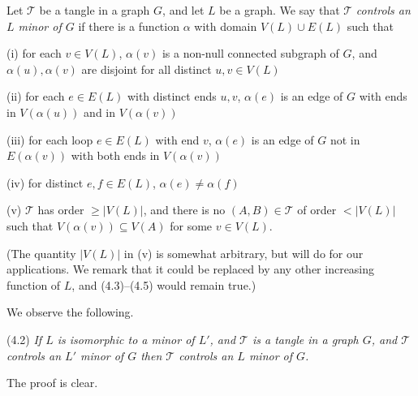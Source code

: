 Let $\mathscr{T}$ be a tangle in a graph $G$, and let $L$ be a graph. We say that $\mathscr{T}$ \textit{controls an $L$ minor of $G$} if there is a function $\alpha$ with domain $V(L) \cup E(L)$ such that

\hspace*{12pt}(i) for each $v \in V(L)$, $\alpha(v)$ is a non-null connected subgraph of $G$, and $\alpha(u), \alpha(v)$ are disjoint for all distinct $u, v \in V(L)$

\hspace*{12pt}(ii) for each $e \in E(L)$ with distinct ends $u, v$, $\alpha(e)$ is an edge of $G$ with ends in $V(\alpha(u))$ and in $V(\alpha(v))$

\hspace*{12pt}(iii) for each loop $e \in E(L)$ with end $v$, $\alpha(e)$ is an edge of $G$ not in $E(\alpha(v))$ with both ends in $V(\alpha(v))$

\hspace*{12pt}(iv) for distinct $e, f \in E(L)$, $\alpha(e) \ne \alpha(f)$

\hspace*{12pt}(v) $\mathscr{T}$ has order $\ge |V(L)|$, and there is no $(A, B) \in \mathscr{T}$ of order $< |V(L)|$ such that $V(\alpha(v)) \subseteq V(A)$ for some $v \in V(L)$.

(The quantity $|V(L)|$ in (v) is somewhat arbitrary, but will do for our applications. We remark that it could be replaced by any other increasing function of $L$, and (4.3)--(4.5) would remain true.)

We observe the following.

\stmt
(4.2) \textit{If $L$ is isomorphic to a minor of $L'$, and $\mathscr{T}$ is a tangle in a graph $G$, and $\mathscr{T}$ controls an $L'$ minor of $G$ then $\mathscr{T}$ controls an $L$ minor of $G$.}

The proof is clear.

